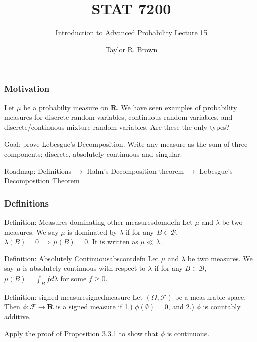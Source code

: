 \documentclass[handout]{beamer}
\title{STAT 7200}
\subtitle{Introduction to Advanced Probability \newline Lecture 15}
\author{Taylor R. Brown}
\institute{}
\date{}
\begin{document}
\frame{\titlepage}

\section[Outline]{}


\section[Beginnings]{}
\frame
{
\frametitle{Motivation} 

Let $\mu$ be a probabilty measure on $\mathbf{R}$. We have seen examples of probability measures for discrete random variables, continuous random variables, and discrete/continuous mixture random variables. Are these the only types?
\newline

Goal: prove Lebesgue's Decomposition. Write any measure as the sum of three components: discrete, absolutely continuous and singular.
\newline


Roadmap: Definitions $\to$ Hahn's Decomposition theorem $\to$ Lebesgue's Decomposition Theorem
\newline



}



\frame
{
\frametitle{Definitions} 


\begin{mytheo}{Definition: Measures dominating other measures}{domdefn}
Let $\mu$ and $\lambda$ be two measures. We say $\mu$ is dominated by $\lambda$ if for any $B \in \mathcal{B}$, $\lambda(B)=0 \implies \mu(B)=0.$ It is written as $\mu \ll \lambda$.
\end{mytheo}

\begin{mytheo}{Definition: Absolutely Continuous}{abscontdefn}
Let $\mu$ and $\lambda$ be two measures. We say $\mu$ is absolutely continuous with respect to $\lambda$ if for any $B \in \mathcal{B}$, $\mu(B) = \int_B f d\lambda$ for some $f \ge 0$.
\end{mytheo}


\begin{mytheo}{Definition: signed measure}{signedmeasure}
Let $(\Omega, \mathcal{F})$ be a measurable space. Then $\phi : \mathcal{F} \to \mathbf{R}$ is a signed measure if 1.) $\phi(\emptyset) = 0$, and 2.) $\phi$ is countably additive.
\end{mytheo}

Apply the proof of Proposition 3.3.1 to show that $\phi$ is continuous.


%   
%                                            

}
\end{document}
